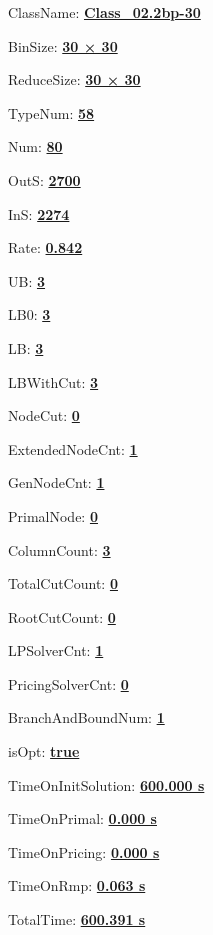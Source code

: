 \documentclass[11pt]{article}
\begin{document}
\pagestyle{empty}


ClassName: \underline{\textbf{Class_02.2bp-30}}
\par
BinSize: \underline{\textbf{30 × 30}}
\par
ReduceSize: \underline{\textbf{30 × 30}}
\par
TypeNum: \underline{\textbf{58}}
\par
Num: \underline{\textbf{80}}
\par
OutS: \underline{\textbf{2700}}
\par
InS: \underline{\textbf{2274}}
\par
Rate: \underline{\textbf{0.842}}
\par
UB: \underline{\textbf{3}}
\par
LB0: \underline{\textbf{3}}
\par
LB: \underline{\textbf{3}}
\par
LBWithCut: \underline{\textbf{3}}
\par
NodeCut: \underline{\textbf{0}}
\par
ExtendedNodeCnt: \underline{\textbf{1}}
\par
GenNodeCnt: \underline{\textbf{1}}
\par
PrimalNode: \underline{\textbf{0}}
\par
ColumnCount: \underline{\textbf{3}}
\par
TotalCutCount: \underline{\textbf{0}}
\par
RootCutCount: \underline{\textbf{0}}
\par
LPSolverCnt: \underline{\textbf{1}}
\par
PricingSolverCnt: \underline{\textbf{0}}
\par
BranchAndBoundNum: \underline{\textbf{1}}
\par
isOpt: \underline{\textbf{true}}
\par
TimeOnInitSolution: \underline{\textbf{600.000 s}}
\par
TimeOnPrimal: \underline{\textbf{0.000 s}}
\par
TimeOnPricing: \underline{\textbf{0.000 s}}
\par
TimeOnRmp: \underline{\textbf{0.063 s}}
\par
TotalTime: \underline{\textbf{600.391 s}}
\par
\newpage
\end{document}
